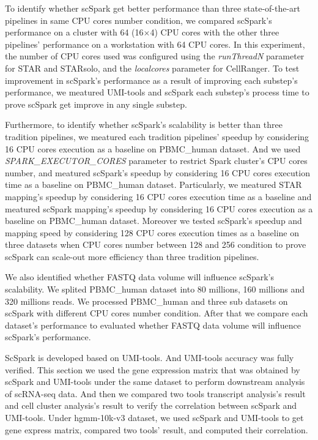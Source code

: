 \documentclass[conference]{IEEEtran}
\begin{document}
To identify whether scSpark get better performance than three state-of-the-art pipelines in same CPU cores number condition,
we compared scSpark's performance on a cluster with 64 (16$\times$4) CPU cores with the other three pipelines' performance on a workstation with 64 CPU cores.
In this experiment, the number of CPU cores used was configured using the \textit{runThreadN} parameter for STAR and STARsolo, and the \textit{localcores} parameter for CellRanger. 
To test improvement in scSpark's performance as a result of improving each substep's performance,
we meatured UMI-tools and scSpark each substep's process time to prove scSpark get improve in any single substep.

Furthermore, to identify whether scSpark's scalability is better than three tradition pipelines, 
we meatured each tradition pipelines' speedup by considering 16 CPU cores execution as a baseline on PBMC\_human dataset.
And we used \textit{SPARK\_EXECUTOR\_CORES} parameter to restrict Spark cluster's CPU cores number, and meatured scSpark's speedup by considering 16 CPU cores execution time as a baseline on PBMC\_human dataset.
Particularly, we meatured STAR mapping's speedup by considering 16 CPU cores execution time as a baseline and meatured scSpark mapping's speedup by considering 16 CPU cores execution as a baseline on PBMC\_human dataset.
Moreover we tested scSpark's speedup and mapping speed by considering 128 CPU cores execution times as a baseline on three datasets when CPU cores number between 128 and 256 condition to prove scSpark can scale-out more efficiency than three tradition pipelines.

We also identified whether FASTQ data volume will influence scSpark's scalability.
We splited PBMC\_human dataset into 80 millions, 160 millions and 320 millions reads.
We processed PBMC\_human and three sub datasets on scSpark with different CPU cores number condition.
After that we compare each dataset's performance to evaluated whether FASTQ data volume will influence scSpark's performance.

ScSpark is developed based on UMI-tools. 
And UMI-tools accuracy was fully verified. 
This section we used the gene expression matrix that was obtained by scSpark and UMI-tools under the same dataset to perform downstream analysis of scRNA-seq data. 
And then we compared two tools transcript analysis's result and cell cluster analysis's result to verify the correlation between scSpark and UMI-tools. 
Under hgmm-10k-v3 dataset, we used scSpark and UMI-tools to get gene express matrix, compared two tools' result, and computed their correlation.
\end{document}
